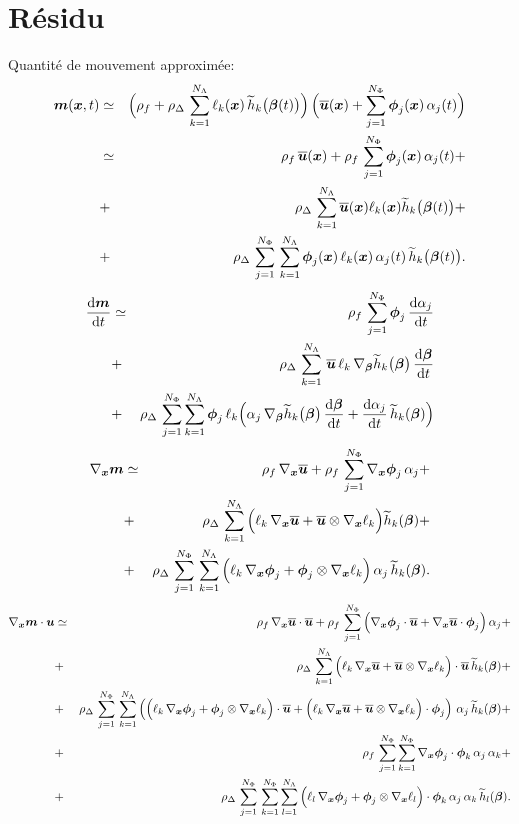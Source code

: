 \documentclass[10pt,a4paper]{article}
\begin{document}
\section{Résidu}
%
Quantité de mouvement approximée: 
\begin{eqnarray}
\vec m(\vx, t) &\simeq &\Big(\rho_f + \rho_\Delta\, \sum_{k=1}^{N_\Lambda} \ell_k(\vx) \, \th_k\big(\vec \beta(t)\big) \Big)\, \Big(\bu(\vx) + \sum_{j=1}^{N_\Phi} \vphi_j(\vx)\,\alpha_j(t) \Big) \\
&\simeq & \rho_f \, \bu(\vx) + \rho_f \, \sum_{j=1}^{N_\Phi} \vphi_j(\vx)\,\alpha_j(t)  + \\
&+& \rho_\Delta\, \sum_{k=1}^{N_\Lambda}\bu(\vx) \ell_k(\vx) \th_k\big(\vec \beta(t)\big)  + \\
&+& \rho_\Delta\, \sum_{j=1}^{N_\Phi} \,\sum_{k=1}^{N_\Lambda} \vphi_j(\vx)\, \ell_k(\vx) \,\alpha_j(t)\, \th_k\big(\vec \beta(t)\big).
\end{eqnarray}
\begin{eqnarray}
 \dt{\vec m } 
&\simeq & \rho_f \, \sum_{j=1}^{N_\Phi} \vphi_j\,\dt{\alpha_j} \\
&+& \rho_\Delta\,\sum_{k=1}^{N_\Lambda}\, \bu  \, \ell_k \, \grad_{\vec \beta}\th_k \big(\vec \beta\big)\,\dt{\vec \beta}\\
&+& \rho_\Delta\,\sum_{j=1}^{N_\Phi} \sum_{k=1}^{N_\Lambda} \vphi_j\, \ell_k \Big(\alpha_j \,  \grad_{\vec \beta}\th_k \big(\vec \beta\big)\,\dt{\vec \beta}+ \dt{\alpha_j}\, \th_k(\vec \beta)\Big) 
\end{eqnarray}
%
\begin{eqnarray}
\grad_{\vx}\vec m &\simeq & \rho_f \, \grad_{\vx}\bu + \rho_f \, \sum_{j=1}^{N_\Phi} \grad_{\vx} \vphi_j\,\alpha_j  + \\
&+& \rho_\Delta\, \sum_{k=1}^{N_\Lambda}\Big( \ell_k \, \grad_{\vx}\bu+ \bu\otimes\grad_{\vx}\ell_k\Big) \th_k (\vec \beta)  + \\
&+& \rho_\Delta\, \sum_{j=1}^{N_\Phi} \,\sum_{k=1}^{N_\Lambda} 
\Big( \ell_k \, \grad_{\vx}\vphi_j+ \vphi_j \otimes\grad_{\vx}\ell_k\Big) \,\alpha_j \, \th_k (\vec \beta).
\end{eqnarray}
%
\begin{eqnarray}
\grad_{\vx}\vec m \cdot \vu &\simeq &\rho_f \, \grad_{\vx}\bu \cdot \bu + \rho_f \, \sum_{j=1}^{N_\Phi} \Big(\grad_{\vx} \vphi_j\cdot \bu + \grad_{\vx}\bu\cdot \vphi_j \Big)\,\alpha_j  + \\
&+& \rho_\Delta\, \sum_{k=1}^{N_\Lambda}\Big( \ell_k \, \grad_{\vx}\bu+ \bu\otimes\grad_{\vx}\ell_k\Big)\cdot \bu \, \th_k (\vec \beta)  + \\
&+& \rho_\Delta\, \sum_{j=1}^{N_\Phi} \,\sum_{k=1}^{N_\Lambda} 
\left(\Big( \ell_k \, \grad_{\vx}\vphi_j+ \vphi_j \otimes\grad_{\vx}\ell_k\Big)\cdot \bu +  \Big( \ell_k \, \grad_{\vx}\bu+ \bu\otimes\grad_{\vx}\ell_k\Big) \cdot \vphi_j \right)\,\alpha_j \, \th_k (\vec \beta) + \\
&+&  \rho_f \, \sum_{j=1}^{N_\Phi} \sum_{k=1}^{N_\Phi}  \grad_{\vx} \vphi_j\cdot \vphi_k \,\alpha_j \,\alpha_k  + \\
&+& \rho_\Delta\, \sum_{j=1}^{N_\Phi} \,\sum_{k=1}^{N_\Phi} \sum_{l=1}^{N_\Lambda}
\Big( \ell_l \, \grad_{\vx}\vphi_j+ \vphi_j \otimes\grad_{\vx}\ell_l\Big)\cdot \vphi_k \, \alpha_j \, \alpha_k \,\th_l (\vec \beta).
\end{eqnarray}
\end{document}
